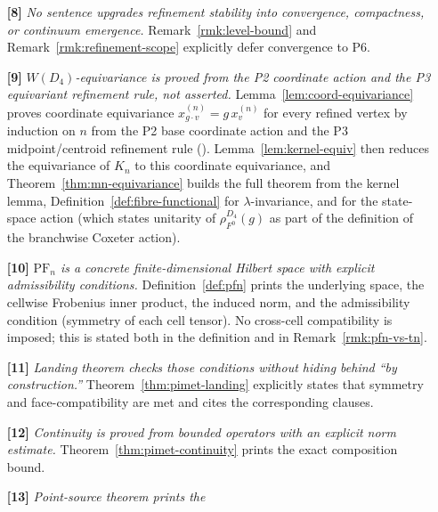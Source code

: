 \documentclass[11pt, a4paper]{amsart}
\theoremstyle{definition}
\newcommand{\PF}{\mathrm{PF}}
\begin{document}
\begin{itemize}
{  operator identity with named maps.}
  Theorem~\ref{thm:mn-refinement} prints
  $q_{n+1, n} \circ M_{n+1} = M_n \circ p_{n+1, n}^0$ with
  both sides named maps defined in \S\ref{sec:refinement}. The
  scope of validity is stated honestly in the theorem statement
  and Remark~\ref{rmk:refinement-scope}: the identity holds on
  level-$(n+1)$ source functions supported on old vertices, and
  is not claimed on the full $\mathcal S_{n+1}$.
\item[\textbf{[8]}] \emph{No sentence upgrades refinement
  stability into convergence, compactness, or continuum
  emergence.} Remark~\ref{rmk:level-bound} and
  Remark~\ref{rmk:refinement-scope} explicitly defer convergence
  to P6.
\item[\textbf{[9]}] \emph{$W(D_4)$-equivariance is proved from
  the P2 coordinate action and the P3 equivariant refinement
  rule, not asserted.} Lemma~\ref{lem:coord-equivariance} proves
  coordinate equivariance $x_{g \cdot v}^{(n)} = g\,x_v^{(n)}$
  for every refined vertex by induction on $n$ from the P2 base
  coordinate action and the P3 midpoint/centroid refinement rule
  (\cite[Def.~2.2]{RefinementSpaces}).
  Lemma~\ref{lem:kernel-equiv} then reduces the equivariance of
  $K_n$ to this coordinate equivariance, and
  Theorem~\ref{thm:mn-equivariance} builds the full theorem from
  the kernel lemma, Definition~\ref{def:fibre-functional} for
  $\lambda$-invariance, and
  \cite[Def.~8.1]{RefinementSpaces} for the state-space action
  (which states unitarity of $\rho_{F^0}^{D_4}(g)$ as part of the
  definition of the branchwise Coxeter action).
\item[\textbf{[10]}] \emph{$\PF_n$ is a concrete
  finite-dimensional Hilbert space with explicit admissibility
  conditions.} Definition~\ref{def:pfn} prints the underlying
  space, the cellwise Frobenius inner product, the induced norm,
  and the admissibility condition (symmetry of each cell tensor).
  No cross-cell compatibility is imposed; this is stated both in
  the definition and in Remark~\ref{rmk:pfn-vs-tn}.
\item[\textbf{[11]}] \emph{Landing theorem checks those
  conditions without hiding behind ``by construction.''}
  Theorem~\ref{thm:pimet-landing} explicitly states that
  symmetry and face-compatibility are met and cites the
  corresponding clauses.
\item[\textbf{[12]}] \emph{Continuity is proved from bounded
  operators with an explicit norm estimate.}
  Theorem~\ref{thm:pimet-continuity} prints the exact
  composition bound.
\item[\textbf{[13]}] \emph{Point-source theorem prints the
}
\end{itemize}
\end{document}
